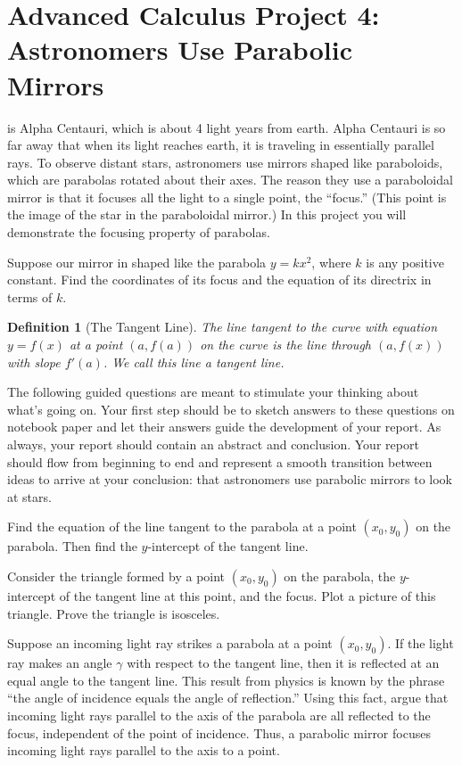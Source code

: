 \documentclass
[justified,nohyper]
{tufte-handout}
\theoremstyle{mydef}
\newtheorem{definition}{Definition}
\begin{document}
\section{Advanced Calculus Project 4: Astronomers Use Parabolic Mirrors}
 is Alpha Centauri, which is about 4 light years from earth. Alpha Centauri is so far away that when its light reaches earth, it is traveling in essentially parallel rays. To observe distant stars, astronomers use mirrors shaped like paraboloids, which are parabolas rotated about their axes. The reason they use a paraboloidal mirror is that it focuses all the light to a single point, the ``focus.'' (This point is the image of the star in the paraboloidal mirror.) In this project you will demonstrate the focusing property of parabolas.

Suppose our mirror in shaped like the parabola $y=kx^2$, where $k$ is any positive constant. Find the coordinates of its focus and the equation of its directrix in terms of $k$.

\begin{definition}[The Tangent Line]
The line tangent to the curve with equation $y=f(x)$ at a point $\left(a,f(a)\right)$ on the curve is the line through $\left(a,f(x)\right)$ with slope $f'(a)$. We call this line a tangent line.
\end{definition}

The following guided questions are meant to stimulate your thinking about what's going on. Your first step should be to sketch answers to these questions on notebook paper and let their answers guide the development of your report. As always, your report should contain an abstract and conclusion. Your report should flow from beginning to end and represent a smooth transition between ideas to arrive at your conclusion: that astronomers use parabolic mirrors to look at stars.

Find the equation of the line tangent to the parabola at a point $(x_0,y_0)$ on the parabola. Then find the $y$-intercept of the tangent line.

Consider the triangle formed by a point $(x_0,y_0)$ on the parabola, the $y$-intercept of the tangent line at this point, and the focus. Plot a picture of this triangle. Prove the triangle is isosceles.

Suppose an incoming light ray strikes a parabola at a point $(x_0,y_0)$. If the light ray makes an angle $\gamma$ with respect to the tangent line, then it is reflected at an equal angle to the tangent line. This result from physics is known by the phrase ``the angle of incidence equals the angle of reflection.'' Using this fact, argue that incoming light rays parallel to the axis of the parabola are all reflected to the focus, independent of the point of incidence. Thus, a parabolic mirror focuses incoming light rays parallel to the axis to a point.
\end{document}
